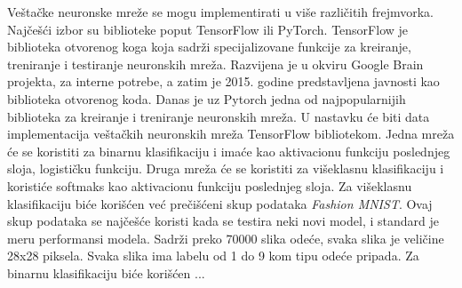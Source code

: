 \documentclass[a4paper,12pt]{report}
\begin{document}
Veštačke neuronske mreže se mogu implementirati u više različitih frejmvorka. Najčešći izbor su biblioteke poput TensorFlow ili PyTorch. TensorFlow je biblioteka otvorenog koga koja sadrži specijalizovane funkcije za kreiranje, treniranje i testiranje neuronskih mreža. Razvijena je u okviru Google Brain projekta, za interne potrebe, a zatim je 2015. godine predstavljena javnosti kao biblioteka otvorenog koda. Danas je uz Pytorch jedna od najpopularnijih biblioteka za kreiranje i treniranje neuronskih mreža. U nastavku će biti data implementacija veštačkih neuronskih mreža TensorFlow bibliotekom. Jedna mreža će se koristiti za binarnu klasifikaciju i imaće kao aktivacionu funkciju poslednjeg sloja, logističku funkciju. Druga mreža će se koristiti za višeklasnu klasifikaciju i koristiće softmaks kao aktivacionu funkciju poslednjeg sloja. Za višeklasnu klasifikaciju biće korišćen već prečišćeni skup podataka \textit{Fashion MNIST}. Ovaj skup podataka se najčešće koristi kada se testira neki novi model, i standard je meru performansi modela. Sadrži preko 70000 slika odeće, svaka slika je veličine 28x28 piksela. Svaka slika ima labelu od 1 do 9 kom tipu odeće pripada. Za binarnu klasifikaciju biće korišćen  ...
\end{document}
